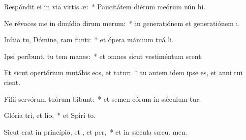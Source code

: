 \item Respóndit ei in via virtis æ:~* Paucitátem diérum meórum nún hi.
\item Ne révoces me in dimídio dirum merum:~* in generatiónem et generatiónem  i.
\item Inítio tu, Dómine, ram funti:~* et ópera mánuum tuá  li.
\item Ipsi períbunt, tu tem manes:~* et omnes sicut vestiméntum scent.
\item Et sicut opertórium mutábis eos, et tatur:~* tu autem idem ipse es, et anni tui  cient.
\item Fílii servórum tuórum bibunt:~* et semen eórum in sǽculum tur.
\item Glória tri, et lio,~* et Spirí to.
\item Sicut erat in princípio, et , et per,~* et in sǽcula sæcu. men.
